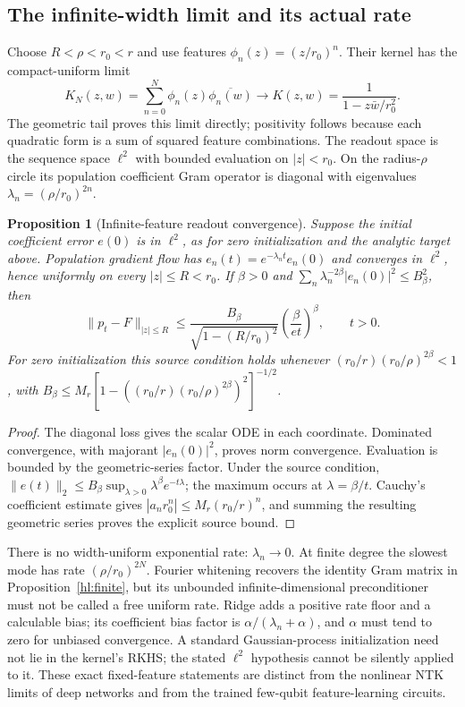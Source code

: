 \documentclass[11pt]{article}
\newtheorem{proposition}[theorem]{Proposition}
\theoremstyle{definition}\newtheorem{definition}[theorem]{Definition}
\theoremstyle{remark}\newtheorem{remark}[theorem]{Remark}
\begin{document}
\subsection{The infinite-width limit and its actual rate}
Choose $R<\rho<r_0<r$ and use features $\phi_n(z)=(z/r_0)^n$.
Their kernel has the compact-uniform limit
\[
 K_N(z,w)=\sum_{n=0}^N\phi_n(z)\overline{\phi_n(w)}
 \longrightarrow K(z,w)=\frac1{1-z\bar w/r_0^2}.
\]
The geometric tail proves this limit directly; positivity follows because
each quadratic form is a sum of squared feature combinations. The readout
space is the sequence space $\ell^2$ with bounded evaluation on $|z|<r_0$.
On the radius-$\rho$ circle its population coefficient Gram operator is
diagonal with eigenvalues $\lambda_n=(\rho/r_0)^{2n}$.

\begin{proposition}[Infinite-feature readout convergence]\label{hl:infinite}
Suppose the initial coefficient error $e(0)$ is in $\ell^2$, as for zero
initialization and the analytic target above. Population gradient flow has
$e_n(t)=e^{-\lambda_nt}e_n(0)$ and converges in $\ell^2$, hence uniformly on
every $|z|\le R<r_0$. If $\beta>0$ and
$\sum_n\lambda_n^{-2\beta}|e_n(0)|^2\le B_\beta^2$, then
\[
 \|p_t-F\|_{|z|\le R}
 \le\frac{B_\beta}{\sqrt{1-(R/r_0)^2}}
       \left(\frac{\beta}{et}\right)^\beta,\qquad t>0.
\]
For zero initialization this source condition holds whenever
$(r_0/r)(r_0/\rho)^{2\beta}<1$, with
$B_\beta\le M_r[1-((r_0/r)(r_0/\rho)^{2\beta})^2]^{-1/2}$.
\end{proposition}
\begin{proof}
The diagonal loss gives the scalar ODE in each coordinate. Dominated
convergence, with majorant $|e_n(0)|^2$, proves norm convergence. Evaluation
is bounded by the geometric-series factor. Under the source condition,
$\|e(t)\|_2\le B_\beta\sup_{\lambda>0}\lambda^\beta e^{-t\lambda}$;
the maximum occurs at $\lambda=\beta/t$. Cauchy's coefficient estimate gives
$|a_n r_0^n|\le M_r(r_0/r)^n$, and summing the resulting geometric series
proves the explicit source bound.
\end{proof}

There is no width-uniform exponential rate: $\lambda_n\to0$. At finite
degree the slowest mode has rate $(\rho/r_0)^{2N}$. Fourier whitening recovers
the identity Gram matrix in Proposition~\ref{hl:finite}, but its unbounded
infinite-dimensional preconditioner must not be called a free uniform rate.
Ridge adds a positive rate floor and a calculable bias; its coefficient bias
factor is $\alpha/(\lambda_n+\alpha)$, and $\alpha$ must tend to zero for
unbiased convergence. A standard Gaussian-process initialization need not
lie in the kernel's RKHS; the stated $\ell^2$ hypothesis cannot be silently
applied to it. These exact fixed-feature statements are distinct from the
nonlinear NTK limits of deep networks \cite{HLNTK} and from the trained
few-qubit feature-learning circuits.
\end{document}
